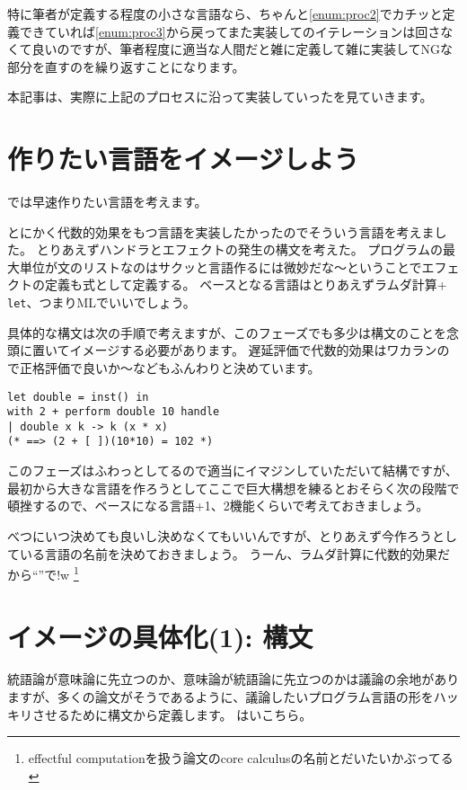 \documentclass{ltjsarticle}
\begin{document}
特に筆者が定義する程度の小さな言語なら、ちゃんと\autoref{enum:proc2}でカチッと定義できていれば\autoref{enum:proc3}から戻ってまた実装してのイテレーションは回さなくて良いのですが、筆者程度に適当な人間だと雑に定義して雑に実装してNGな部分を直すのを繰り返すことになります。

本記事は、実際に上記のプロセスに沿って実装していった\lambdaeff{}を見ていきます。

\section{作りたい言語をイメージしよう}
では早速作りたい言語を考えます。

とにかく代数的効果をもつ言語を実装したかったのでそういう言語を考えました\footnotemark{}。
とりあえずハンドラとエフェクトの発生の構文を考えた。
プログラムの最大単位が文のリストなのはサクッと言語作るには微妙だな〜ということでエフェクトの定義も式として定義する。
ベースとなる言語はとりあえずラムダ計算+\,\lstinline{let}、つまりMLでいいでしょう。

具体的な構文は次の手順で考えますが、このフェーズでも多少は構文のことを念頭に置いてイメージする必要があります。
遅延評価で代数的効果はワカランので正格評価で良いか〜などもふんわりと決めています。

\begin{lstlisting}[caption={こんな感じに……},label={lst:konnakanji}]
let double = inst() in
with 2 + perform double 10 handle
| double x k -> k (x * x)
(* ==> (2 + [ ])(10*10) = 102 *)
\end{lstlisting}

このフェーズはふわっとしてるので適当にイマジンしていただいて結構ですが、最初から大きな言語を作ろうとしてここで巨大構想を練るとおそらく次の段階で頓挫するので、ベースになる言語+1、2機能くらいで考えておきましょう。

べつにいつ決めても良いし決めなくてもいいんですが、とりあえず今作ろうとしている言語の名前を決めておきましょう。
うーん、ラムダ計算に代数的効果だから``\lambdaeff{}''で!w \footnote{effectful computationを扱う論文のcore calculusの名前とだいたいかぶってる}

\section{イメージの具体化(1): 構文}
統語論が意味論に先立つのか、意味論が統語論に先立つのかは議論の余地がありますが、多くの論文がそうであるように、議論したいプログラム言語の形をハッキリさせるために構文から定義します。
はいこちら。
\end{document}

